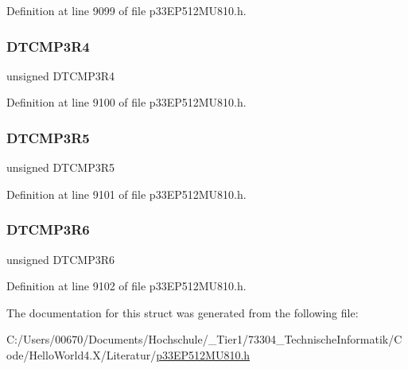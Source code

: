 Definition at line 9099 of file p33\+E\+P512\+M\+U810.\+h.

\mbox{\label{structtag_r_p_i_n_r39_b_i_t_s_af9ad429b96907dd0cbb29fca00f19e8b}} 
\subsubsection{\texorpdfstring{D\+T\+C\+M\+P3\+R4}{DTCMP3R4}}
{\footnotesize\ttfamily unsigned D\+T\+C\+M\+P3\+R4}



Definition at line 9100 of file p33\+E\+P512\+M\+U810.\+h.

\mbox{\label{structtag_r_p_i_n_r39_b_i_t_s_a5889b4962bc3865a1c2fb26388a4dd35}} 
\subsubsection{\texorpdfstring{D\+T\+C\+M\+P3\+R5}{DTCMP3R5}}
{\footnotesize\ttfamily unsigned D\+T\+C\+M\+P3\+R5}



Definition at line 9101 of file p33\+E\+P512\+M\+U810.\+h.

\mbox{\label{structtag_r_p_i_n_r39_b_i_t_s_a2a91bbada52f189d28b014c167d33bae}} 
\subsubsection{\texorpdfstring{D\+T\+C\+M\+P3\+R6}{DTCMP3R6}}
{\footnotesize\ttfamily unsigned D\+T\+C\+M\+P3\+R6}



Definition at line 9102 of file p33\+E\+P512\+M\+U810.\+h.



The documentation for this struct was generated from the following file\+:\begin{DoxyCompactItemize}
\item 
C\+:/\+Users/00670/\+Documents/\+Hochschule/\+\_\+\+Tier1/73304\+\_\+\+Technische\+Informatik/\+Code/\+Hello\+World4.\+X/\+Literatur/\hyperlink{p33_e_p512_m_u810_8h}{p33\+E\+P512\+M\+U810.\+h}\end{DoxyCompactItemize}
